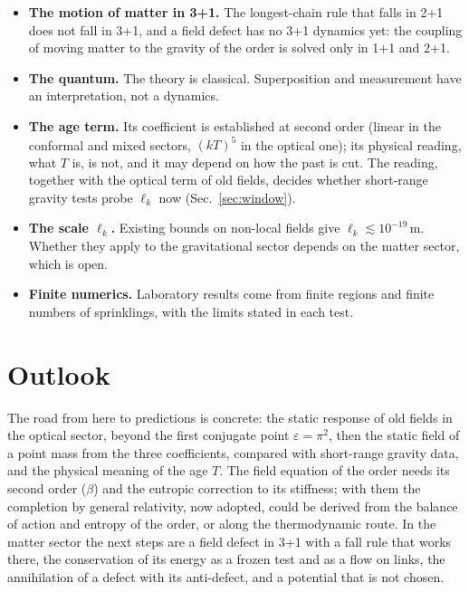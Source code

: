 \begin{itemize}
  energy is conserved as a Noether charge in the mean (2D, development); whether this charge is a flow on the
  links of the order is open.
\item \textbf{The motion of matter in 3+1.} The longest-chain rule that falls in 2+1 does not fall in 3+1, and a
  field defect has no 3+1 dynamics yet: the coupling of moving matter to the gravity of the order is solved only
  in 1+1 and 2+1.
\item \textbf{The quantum.} The theory is classical. Superposition and measurement have an
  interpretation, not a dynamics.
\item \textbf{The age term.} Its coefficient is established at second order (linear in the conformal and
  mixed sectors, $(kT)^5$ in the optical one); its physical reading, what $T$ is, is not, and it may depend on how
  the past is cut. The reading, together with the optical term of old fields, decides whether short-range
  gravity tests probe $\ell_k$ now (Sec.~\ref{sec:window}).
\item \textbf{The scale $\ell_k$.} Existing bounds on non-local fields give $\ell_k\lesssim10^{-19}$\,m. Whether
  they apply to the gravitational sector depends on the matter sector, which is open.
\item \textbf{Finite numerics.} Laboratory results come from finite regions and finite numbers of
  sprinklings, with the limits stated in each test.
\end{itemize}

\section{Outlook}\label{sec:outlook}

The road from here to predictions is concrete: the static response of old fields in the optical sector,
beyond the first conjugate point $\varepsilon=\pi^2$, then the static field of a point mass from the three coefficients, compared with short-range gravity data,
and the physical meaning of the age $T$. The field equation of the order needs its second order ($\beta$) and the
entropic correction to its stiffness; with them the completion by general relativity, now adopted, could be derived
from the balance of action and entropy of the order, or along the thermodynamic route. In the matter sector the
next steps are a field defect in 3+1 with a fall rule that works there, the conservation of its energy as a frozen
test and as a flow on links, the annihilation of a defect with its anti-defect, and a potential that is not chosen.

